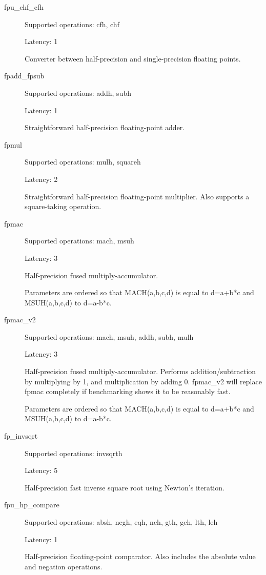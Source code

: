 \documentclass[twoside]{tceusermanual}
\begin{document}
\begin{description}

\item[fpu\_chf\_cfh]

Supported operations: cfh, chf

Latency: 1

Converter between half-precision and single-precision floating points.

\item[fpadd\_fpsub]

Supported operations: addh, subh

Latency: 1

Straightforward half-precision floating-point adder.

\item[fpmul]

Supported operations:         mulh, squareh

Latency:             2

Straightforward half-precision floating-point multiplier. Also supports a square-taking operation.

\item[fpmac]

Supported operations:         mach, msuh

Latency:             3

Half-precision fused multiply-accumulator.

Parameters are ordered so that MACH(a,b,c,d) is equal to d=a+b*c and MSUH(a,b,c,d) to d=a-b*c.

\item[fpmac\_v2]

Supported operations:         mach, msuh, addh, subh, mulh

Latency:             3

Half-precision fused multiply-accumulator. Performs addition/subtraction by multiplying by 1,
and multiplication by adding 0. fpmac\_v2 will replace fpmac completely if benchmarking shows it
to be reasonably fast.

Parameters are ordered so that MACH(a,b,c,d) is equal to d=a+b*c and MSUH(a,b,c,d) to d=a-b*c.


\item[fp\_invsqrt]

Supported operations: invsqrth

Latency:             5

Half-precision fast inverse square root using Newton's iteration.

\item[fpu\_hp\_compare]

Supported operations:         absh, negh, eqh, neh, gth, geh, lth, leh

Latency:             1

Half-precision floating-point comparator. Also includes the absolute value and negation operations.

\end{description}
\end{document}
